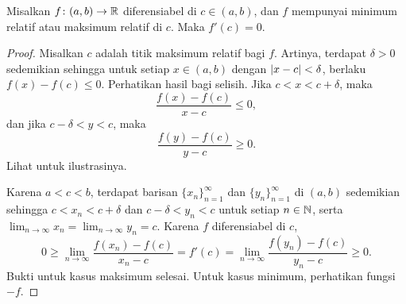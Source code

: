 \begin{lemma}\label{relminmax:lemma}
Misalkan $f \colon (a,b) \to {\mathbb{R}}$ diferensiabel di $c \in (a,b)$,
dan $f$ mempunyai
minimum relatif atau maksimum relatif di $c$.  Maka
$f'(c) = 0$.
\end{lemma}

\begin{proof}
Misalkan $c$ adalah 
titik maksimum relatif bagi $f$.  Artinya, terdapat $\delta > 0$ sedemikian
sehingga untuk setiap $x \in (a,b)$ dengan
$\lvert {x-c} \rvert < \delta$, berlaku $f(x)-f(c) \leq 0$.
Perhatikan hasil bagi
selisih.  Jika $c < x < c+\delta$, maka
\begin{equation*}
\frac{f(x)-f(c)}{x-c} \leq 0 ,
\end{equation*}
dan jika $c-\delta < y < c$, maka
\begin{equation*}
\frac{f(y)-f(c)}{y-c} \geq 0 .
\end{equation*}
Lihat  untuk ilustrasinya.
\begin{myfigureht}
\caption{Kemiringan garis-garis sekan pada suatu maksimum relatif.\label{fig:critpt}}
\end{myfigureht}

Karena $a < c < b$, terdapat
barisan $\{ x_n \}_{n=1}^\infty$ dan
$\{ y_n \}_{n=1}^\infty$ di $(a,b)$
sedemikian sehingga $c < x_n < c+\delta$ dan
$c-\delta < y_n < c$ untuk setiap $n \in {\mathbb{N}}$, serta
$\lim_{n\to\infty} x_n = \lim_{n\to\infty} y_n = c$.
Karena $f$
diferensiabel di $c$,
\begin{equation*}
0 \geq \lim_{n\to\infty} \frac{f(x_n)-f(c)}{x_n-c} 
=
f'(c)
=
\lim_{n\to\infty} \frac{f(y_n)-f(c)}{y_n-c} \geq 0.
\end{equation*}
Bukti untuk kasus maksimum selesai.
Untuk kasus minimum, perhatikan
fungsi $-f$.
\end{proof}


